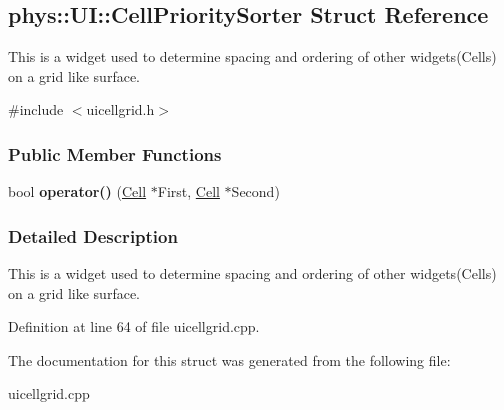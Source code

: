 \hypertarget{structphys_1_1UI_1_1CellPrioritySorter}{
\subsection{phys::UI::CellPrioritySorter Struct Reference}
\label{d0/d2c/structphys_1_1UI_1_1CellPrioritySorter}
}


This is a widget used to determine spacing and ordering of other widgets(Cells) on a grid like surface.  




{\ttfamily \#include $<$uicellgrid.h$>$}

\subsubsection*{Public Member Functions}
\begin{DoxyCompactItemize}
\item 
\hypertarget{structphys_1_1UI_1_1CellPrioritySorter_a96651d3e8c3312eab4b25809a6cc4ce6}{
bool {\bfseries operator()} (\hyperlink{classphys_1_1UI_1_1Cell}{Cell} $\ast$First, \hyperlink{classphys_1_1UI_1_1Cell}{Cell} $\ast$Second)}
\label{d0/d2c/structphys_1_1UI_1_1CellPrioritySorter_a96651d3e8c3312eab4b25809a6cc4ce6}

\end{DoxyCompactItemize}


\subsubsection{Detailed Description}
This is a widget used to determine spacing and ordering of other widgets(Cells) on a grid like surface. 

Definition at line 64 of file uicellgrid.cpp.



The documentation for this struct was generated from the following file:\begin{DoxyCompactItemize}
\item 
uicellgrid.cpp\end{DoxyCompactItemize}
